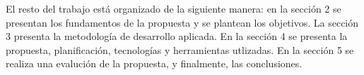 El resto del trabajo está organizado de la siguiente manera: en la sección 2 se presentan los fundamentos de la propuesta y se plantean los 
objetivos. La sección 3 presenta la metodología de desarrollo aplicada. En la sección 4 se presenta la propuesta, planificación, 
tecnologías y herramientas utlizadas. En la sección 5 se realiza una evalución de la propuesta, y finalmente, las conclusiones.